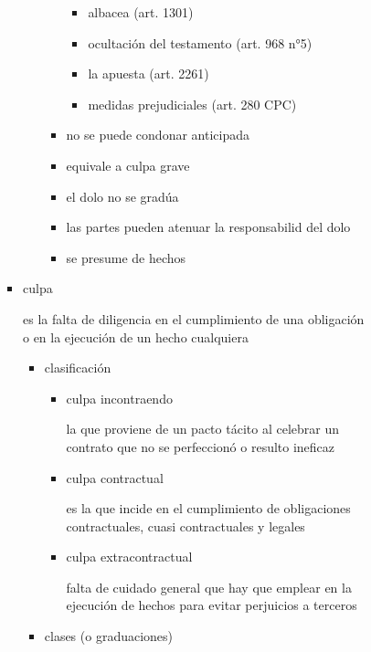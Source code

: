 \documentclass[]{article}
\providecommand{\tightlist}{%
  \setlength{\itemsep}{0pt}\setlength{\parskip}{0pt}}
\begin{document}
\begin{itemize}
\begin{itemize}
\begin{itemize}
\begin{itemize}
\begin{itemize}
\begin{itemize}
\begin{itemize}
              \begin{itemize}
              \tightlist
              \item
                albacea (art. 1301)
              \item
                ocultación del testamento (art. 968 n°5)
              \item
                la apuesta (art. 2261)
              \item
                medidas prejudiciales (art. 280 CPC)
              \end{itemize}
            \item
              no se puede condonar anticipada
            \item
              equivale a culpa grave
            \item
              el dolo no se gradúa
            \item
              las partes pueden atenuar la responsabilid del dolo
            \item
              se presume de hechos
            \end{itemize}
          \end{itemize}
        \item
          culpa

          es la falta de diligencia en el cumplimiento de una obligación
          o en la ejecución de un hecho cualquiera

          \begin{itemize}
          \tightlist
          \item
            clasificación

            \begin{itemize}
            \item
              culpa incontraendo

              la que proviene de un pacto tácito al celebrar un contrato
              que no se perfeccionó o resulto ineficaz
            \item
              culpa contractual

              es la que incide en el cumplimiento de obligaciones
              contractuales, cuasi contractuales y legales
            \item
              culpa extracontractual

              falta de cuidado general que hay que emplear en la
              ejecución de hechos para evitar perjuicios a terceros
            \end{itemize}
          \item
            clases (o graduaciones)


\end{itemize}
\end{itemize}
\end{itemize}
\end{itemize}
\end{itemize}
\end{itemize}
\end{document}

